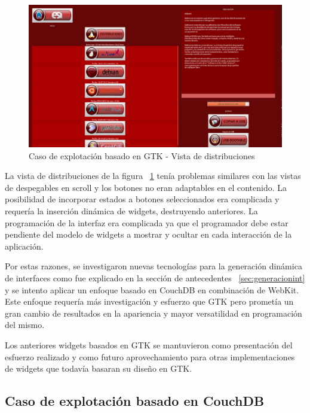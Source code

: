 \begin{figure}[ht]
    \begin{center}
        \includegraphics[width=425px]{src/img/freestation-distro-buttons.png}
        \caption[Caso de explotación basado en GTK - Vista de distribuciones]
          {Caso de explotación basado en GTK - Vista de distribuciones}
          \label{fig:distroviewgtk}
    \end{center}
\end{figure}

La vista de distribuciones de la figura ~\ref{fig:distroviewgtk} tenía
problemas similares con las vistas de despegables en scroll y los botones no 
eran adaptables en el contenido. La posibilidad de incorporar estados a botones
seleccionados era complicada y requería la inserción dinámica de widgets, 
destruyendo anteriores. La programación de la interfaz era complicada ya que el
programador debe estar pendiente del modelo de widgets a mostrar y ocultar en
cada interacción de la aplicación.

Por estas razones, se investigaron nuevas tecnologías para la generación
dinámica de interfaces como fue explicado en la sección de antecedentes
~\ref{sec:generacionint} y se intento aplicar un enfoque basado en CouchDB en
combinación de WebKit. Este enfoque requería más investigación y esfuerzo que
GTK pero prometía un gran cambio de resultados en la apariencia y mayor
versatilidad en programación del mismo.

Los anteriores widgets basados en GTK se mantuvieron como presentación del
esfuerzo realizado y como futuro aprovechamiento para otras implementaciones de
widgets que todavía basaran su diseño en GTK.

\newpage

\subsection{Caso de explotación basado en CouchDB}

